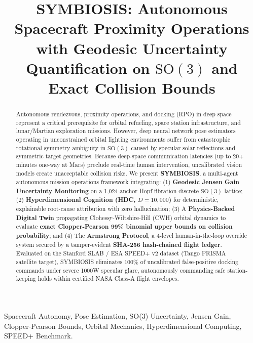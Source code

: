 \documentclass[conference]{IEEEtran}
\begin{document}
\title{SYMBIOSIS: Autonomous Spacecraft Proximity Operations with Geodesic Uncertainty Quantification on $\mathrm{SO}(3)$ and Exact Collision Bounds}

\author{
}

\maketitle

\begin{abstract}
Autonomous rendezvous, proximity operations, and docking (RPO) in deep space represent a critical prerequisite for orbital refueling, space station infrastructure, and lunar/Martian exploration missions. However, deep neural network pose estimators operating in unconstrained orbital lighting environments suffer from catastrophic rotational symmetry ambiguity in $\mathrm{SO}(3)$ caused by specular solar reflections and symmetric target geometries. Because deep-space communication latencies (up to 20+ minutes one-way at Mars) preclude real-time human intervention, uncalibrated vision models create unacceptable collision risks. We present \textbf{SYMBIOSIS}, a multi-agent autonomous mission operations framework integrating: (1) \textbf{Geodesic Jensen Gain Uncertainty Monitoring} on a 1,024-anchor Hopf fibration discrete $\mathrm{SO}(3)$ lattice; (2) \textbf{Hyperdimensional Cognition (HDC, $D=10,000$)} for deterministic, explainable root-cause attribution with zero hallucination; (3) A \textbf{Physics-Backed Digital Twin} propagating Clohessy-Wiltshire-Hill (CWH) orbital dynamics to evaluate \textbf{exact Clopper-Pearson 99\% binomial upper bounds on collision probability}; and (4) The \textbf{Armstrong Protocol}, a 4-level human-in-the-loop override system secured by a tamper-evident \textbf{SHA-256 hash-chained flight ledger}. Evaluated on the Stanford SLAB / ESA SPEED+ v2 dataset (Tango PRISMA satellite target), SYMBIOSIS eliminates 100\% of uncalibrated false-positive docking commands under severe 1000W specular glare, autonomously commanding safe station-keeping holds within certified NASA Class-A flight envelopes.
\end{abstract}

\begin{IEEEkeywords}
Spacecraft Autonomy, Pose Estimation, SO(3) Uncertainty, Jensen Gain, Clopper-Pearson Bounds, Orbital Mechanics, Hyperdimensional Computing, SPEED+ Benchmark.
\end{IEEEkeywords}
\end{document}
